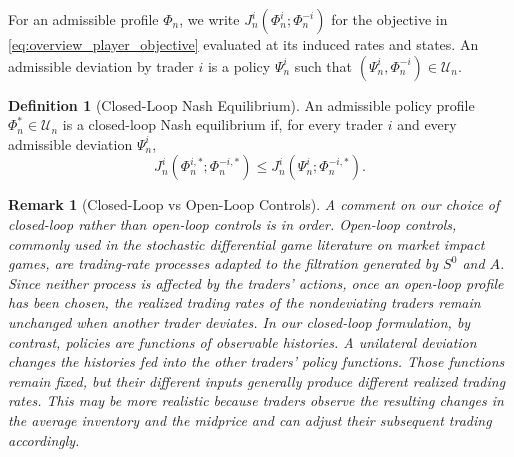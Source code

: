 \documentclass[12pt]{article}
\numberwithin{equation}{section}
\newtheorem{remark}[theorem]{Remark}
\theoremstyle{definition}
\newtheorem{definition}[theorem]{Definition}
\begin{document}
For an admissible profile \(\Phi_n\), we write
\(J_n^i(\Phi_n^i;\Phi_n^{-i})\) for the objective in
\eqref{eq:overview_player_objective} evaluated at its induced rates and states.
An admissible deviation by trader \(i\) is a policy \(\Psi_n^i\) such
that \((\Psi_n^i,\Phi_n^{-i})\in\mathcal U_n\).

\begin{definition}[Closed-Loop Nash Equilibrium]
\label{def:nash_equilibrium}
An admissible policy profile \(\Phi_n^*\in\mathcal U_n\) is a closed-loop
Nash equilibrium if, for every trader \(i\) and every admissible deviation
\(\Psi_n^i\),
\begin{equation}\label{eq:ne_definition}
J_n^i(\Phi_n^{i,*};\Phi_n^{-i,*})
\leq
J_n^i(\Psi_n^i;\Phi_n^{-i,*}).
\end{equation}
\end{definition}

\begin{remark}[Closed-Loop vs Open-Loop Controls]
A comment on our choice of closed-loop rather than \emph{open-loop controls} is in
order. Open-loop controls, commonly used in the stochastic differential game literature
on market impact games, are
trading-rate processes adapted to the filtration generated by \(S^0\) and
\(A\). Since neither process is affected by the traders' actions, once an
open-loop profile has been chosen, the realized trading rates of the
nondeviating traders remain unchanged when another trader deviates. In our
closed-loop formulation, by contrast, policies are functions of observable
histories. A unilateral deviation changes the histories fed into the other
traders' policy functions. Those functions remain fixed, but their different
inputs generally produce different realized trading rates. This may be more
realistic because traders observe the resulting changes in the average
inventory and the midprice and can adjust their subsequent trading accordingly.
\end{remark}
\end{document}
